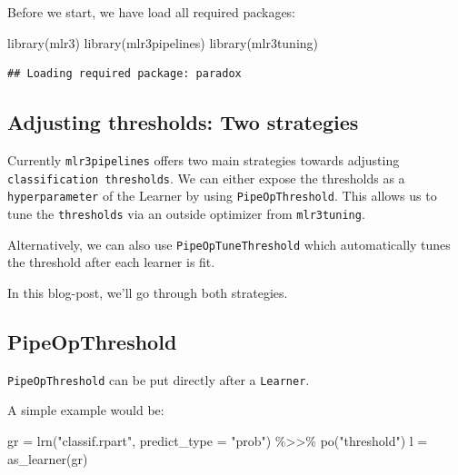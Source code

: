 \documentclass[
]{scrbook}
\newenvironment{Shaded}{\begin{snugshade}}{\end{snugshade}}
\newcommand{\AttributeTok}[1]{\textcolor[rgb]{0.77,0.63,0.00}{#1}}
\newcommand{\FunctionTok}[1]{\textcolor[rgb]{0.00,0.00,0.00}{#1}}
\newcommand{\NormalTok}[1]{#1}
\newcommand{\OtherTok}[1]{\textcolor[rgb]{0.56,0.35,0.01}{#1}}
\newcommand{\SpecialCharTok}[1]{\textcolor[rgb]{0.00,0.00,0.00}{#1}}
\newcommand{\StringTok}[1]{\textcolor[rgb]{0.31,0.60,0.02}{#1}}
\renewenvironment{Shaded} {\begin{snugshade}\small} {\end{snugshade}}
\begin{document}
Before we start, we have load all required packages:

\begin{Shaded}
\begin{Highlighting}[]
\FunctionTok{library}\NormalTok{(mlr3)}
\FunctionTok{library}\NormalTok{(mlr3pipelines)}
\FunctionTok{library}\NormalTok{(mlr3tuning)}
\end{Highlighting}
\end{Shaded}

\begin{verbatim}
## Loading required package: paradox
\end{verbatim}

\hypertarget{adjusting-thresholds-two-strategies}{%
\subsection{Adjusting thresholds: Two strategies}\label{adjusting-thresholds-two-strategies}}

Currently \texttt{mlr3pipelines} offers two main strategies towards adjusting \texttt{classification\ thresholds}.
We can either expose the thresholds as a \texttt{hyperparameter} of the Learner by using \texttt{PipeOpThreshold}.
This allows us to tune the \texttt{thresholds} via an outside optimizer from \texttt{mlr3tuning}.

Alternatively, we can also use \texttt{PipeOpTuneThreshold} which automatically tunes the threshold after each learner is fit.

In this blog-post, we'll go through both strategies.

\hypertarget{pipeopthreshold}{%
\subsection{PipeOpThreshold}\label{pipeopthreshold}}

\texttt{PipeOpThreshold} can be put directly after a \texttt{Learner}.

A simple example would be:

\begin{Shaded}
\begin{Highlighting}[]
\NormalTok{gr }\OtherTok{=} \FunctionTok{lrn}\NormalTok{(}\StringTok{"classif.rpart"}\NormalTok{, }\AttributeTok{predict\_type =} \StringTok{"prob"}\NormalTok{) }\SpecialCharTok{\%\textgreater{}\textgreater{}\%} \FunctionTok{po}\NormalTok{(}\StringTok{"threshold"}\NormalTok{)}
\NormalTok{l }\OtherTok{=} \FunctionTok{as\_learner}\NormalTok{(gr)}
\end{Highlighting}
\end{Shaded}
\end{document}
